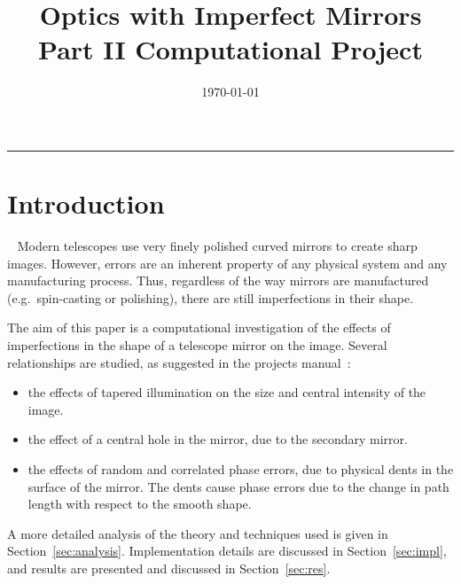 \documentclass{article}
\begin{document}
\title{Optics with Imperfect Mirrors\\Part II Computational Project}
\author{}
\date{\today}
\maketitle


\noindent\rule{0.85\textwidth}{0.4pt}


\section{Introduction}~\label{sec:intro}
Modern telescopes use very finely polished curved mirrors to create sharp images. However, errors are an inherent property of any physical system and any manufacturing process. Thus, regardless of the way mirrors are manufactured (e.g.\ spin-casting or polishing), there are still imperfections in their shape.

The aim of this paper is a computational investigation of the effects of imperfections in the shape of a telescope mirror on the image. Several relationships are studied, as suggested in the projects manual~\cite{manual}:
\begin{itemize}
    \item the effects of tapered illumination on the size and central intensity of the image.
    \item the effect of a central hole in the mirror, due to the secondary mirror.
    \item the effects of random and correlated phase errors, due to physical dents in the surface of the mirror. The dents cause phase errors due to the change in path length with respect to the smooth shape.
\end{itemize}

A more detailed analysis of the theory and techniques used is given in Section~\ref{sec:analysis}. Implementation details are discussed in Section~\ref{sec:impl}, and results are presented and discussed in Section~\ref{sec:res}.
\end{document}

